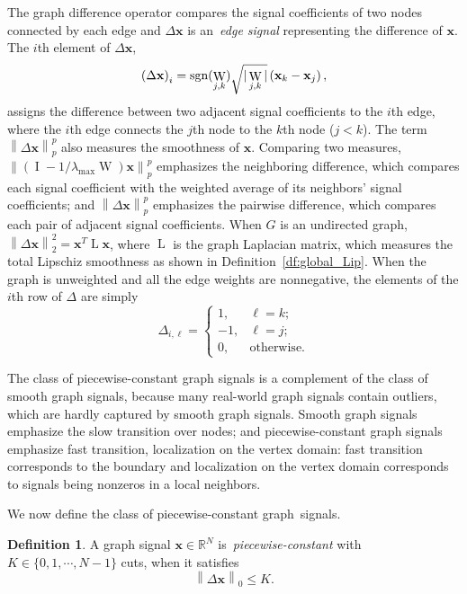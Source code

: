 \documentclass[journal,twocolumn,10pt]{IEEEtran}
\theoremstyle{definition}
\newtheorem{defn}{Definition}
\newcommand{\R}{\ensuremath{\mathbb{R}}}
\DeclareMathOperator{\Id}{I}
\def\x{\mathbf{x}}
\DeclareMathOperator{\LL}{L}
\DeclareMathOperator{\W}{W}
\begin{document}
The graph difference operator compares the signal coefficients of two nodes connected by each edge and $\Delta \x$ is an~\emph{edge signal} representing the difference of $\x$. The $i$th element of $\Delta \x$,
$$
\left(  \Delta \x  \right)_i = {\rm sgn}(\W_{j,k}) \sqrt{ | \W_{j,k} | } \left(  \x_k - \x_j \right),
$$
assigns the difference between two adjacent signal coefficients to the $i$th edge,  where the $i$th edge connects the $j$th node to the $k$th node ($j < k$). The term $\left\| \Delta \x \right\|_p^p$ also measures the smoothness of $\x$. Comparing two measures, $\left\| \left( \Id - 1/\lambda_{\max} \W \right) \x \right\|_p^p$ emphasizes the neighboring difference, which compares each signal coefficient with the weighted average of its neighbors' signal coefficients; and $\left\| \Delta \x \right\|_p^p$  emphasizes the pairwise difference, which compares each pair of adjacent signal coefficients. When $G$ is an undirected graph, $\left\| \Delta \x \right\|_2^2 = \x^T \LL \x$, where $\LL$ is the graph Laplacian matrix, which measures the total Lipschiz smoothness as shown in Definition~\ref{df:global_Lip}. When the graph is unweighted and all the edge weights are nonnegative, the elements of the $i$th row of $\Delta$ are simply
\begin{equation*}
\label{eq:C}
 \Delta_{i, \ell} = 
  \left\{ 
    \begin{array}{rl}
      1, & \ell = k;  \\
      -1, & \ell = j; \\
      0, & \mbox{otherwise}.
  \end{array} \right.
\end{equation*}


The class of piecewise-constant graph signals is a complement of the class of smooth graph signals, because many real-world graph signals contain outliers, which are hardly captured by smooth graph signals. Smooth graph signals emphasize the slow transition over nodes; and piecewise-constant graph signals emphasize fast transition, localization on the vertex domain: fast transition corresponds to the boundary and localization on the vertex domain corresponds to signals being nonzeros in a local neighbors.

We now define the class of piecewise-constant graph~signals.
\begin{defn}
  \label{df:pc_des}
  A graph signal $\x \in \R^N$ is~\emph{piecewise-constant} with $K \in
  \{0, 1, \cdots, N-1\}$ cuts, when it satisfies
  \begin{displaymath}
  \left\| \Delta \x  \right\|_0 \leq K.
\end{displaymath}
\end{defn}
\end{document}
